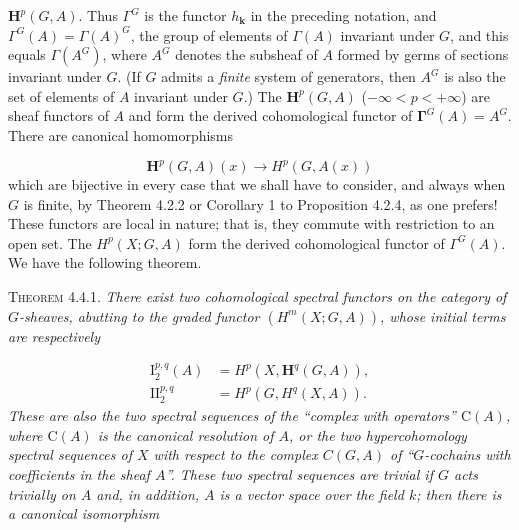 \clearpage
{}

$\mathbf H^p(G,A)$. Thus $\Gamma^G$ is the functor $h_{\mathbf k}$ in the preceding notation,
and
$\Gamma^G(A)=\Gamma(A)^G$, the group of elements of $\Gamma(A)$ invariant
under $G$, and this equals $\Gamma(A^G)$, where $A^G$ denotes the subsheaf of
$A$ formed by germs of sections invariant under $G$. (If $G$ admits a \textit{finite}
system of generators, then $A^G$ is also the set of elements of $A$ invariant
under $G$.)
The $\mathbf H^p(G,A)$ ($-\infty<p<+\infty$) are sheaf functors of $A$ and
form the derived cohomological functor of
$\boldsymbol{\Gamma}^G(A)=A^G$. There are canonical homomorphisms

\[
\mathbf H^p(G,A)(x)\to H^p(G,A(x))
\]
which are bijective in every case that we shall have to consider, and always
when $G$ is finite, by Theorem 4.2.2 or Corollary 1 to Proposition 4.2.4, as
one prefers! These functors are local in nature; that is, they commute with
restriction to an open set.
The $H^p(X;G,A)$ form the derived cohomological functor of $\Gamma^G(A)$.
We have the following theorem.

\textsc{Theorem 4.4.1.} \textit{There exist two cohomological spectral
functors on the category of $G$-sheaves, abutting to the graded functor
$(H^m(X;G,A))$, whose initial terms are respectively}

\[
\tag{4.4.1}
\begin{aligned}
\mathrm I_2^{p,q}(A)&=H^p(X,\mathbf H^q(G,A)),\\
\mathrm {II}_2^{p,q}&=H^p(G,H^q(X,A)).
\end{aligned}
\]
\textit{These are also the two spectral sequences of the \textup{``}complex with
operators\textup{''} $\mathrm C(A)$, where $\mathrm C(A)$ is the canonical resolution of $A$, or the
two hypercohomology spectral sequences of $X$ with respect to the complex
$C(G,A)$ of \textup{``}$G$-cochains with coefficients in the sheaf $A$\textup{''}. These two
spectral sequences are trivial if $G$ acts trivially on $A$ and, in addition,
$A$ is a vector space over the field $k$; then there is a canonical
isomorphism}

